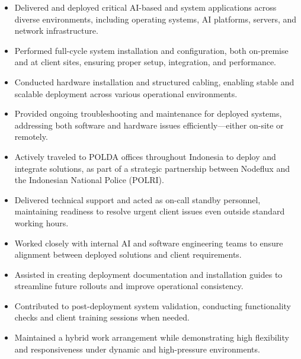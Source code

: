 \documentclass[10pt, letterpaper]{article}
\newenvironment{highlights}{
    \begin{itemize}[
        topsep=0.10 cm,
        parsep=0.10 cm,
        partopsep=0pt,
        itemsep=0pt,
        leftmargin=0 cm + 10pt
    ]
}{
    \end{itemize}
} %
\begin{document}
        \begin{justify}
            \begin{highlights}
               	\item Delivered and deployed critical AI-based and system applications across diverse environments, including operating systems, AI platforms, servers, and network infrastructure.
               	
               	\item Performed full-cycle system installation and configuration, both on-premise and at client sites, ensuring proper setup, integration, and performance.
               	
               	\item Conducted hardware installation and structured cabling, enabling stable and scalable deployment across various operational environments.
                
               	\item Provided ongoing troubleshooting and maintenance for deployed systems, addressing both software and hardware issues efficiently—either on-site or remotely.
               	
               	\item Actively traveled to POLDA offices throughout Indonesia to deploy and integrate solutions, as part of a strategic partnership between Nodeflux and the Indonesian National Police (POLRI).
               	
               	\item Delivered technical support and acted as on-call standby personnel, maintaining readiness to resolve urgent client issues even outside standard working hours.
                
                \item Worked closely with internal AI and software engineering teams to ensure alignment between deployed solutions and client requirements.
                
                \item Assisted in creating deployment documentation and installation guides to streamline future rollouts and improve operational consistency.
                
                \item Contributed to post-deployment system validation, conducting functionality checks and client training sessions when needed.

                \item Maintained a hybrid work arrangement while demonstrating high flexibility and responsiveness under dynamic and high-pressure environments.
            \end{highlights}
        \end{justify}
\end{document}
